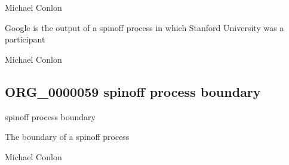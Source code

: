 \documentclass[letterpaper,10pt,english]{sphinxmanual}
\begin{document}
\begin{sphinxShadowBox}

\sphinxAtStartPar
Michael Conlon 
\end{sphinxShadowBox}

\begin{sphinxShadowBox}

\sphinxAtStartPar
Google is the output of a spin\sphinxhyphen{}off process in which Stanford University was a participant
\end{sphinxShadowBox}

\begin{sphinxShadowBox}

\sphinxAtStartPar
Michael Conlon 
\end{sphinxShadowBox}
\begin{quote}

\ignorespaces \end{quote}


\subsection{ORG\_0000059 \sphinxhyphen{} spin\sphinxhyphen{}off process boundary}
\label{\detokenize{doc-ORG_0000059:org-0000059-spin-off-process-boundary}}\label{\detokenize{doc-ORG_0000059:index-0}}\label{\detokenize{doc-ORG_0000059::doc}}
\begin{sphinxShadowBox}

\sphinxAtStartPar
spin\sphinxhyphen{}off process boundary
\end{sphinxShadowBox}

\begin{sphinxShadowBox}

\sphinxAtStartPar
The boundary of a spin\sphinxhyphen{}off process
\end{sphinxShadowBox}

\begin{sphinxShadowBox}

\sphinxAtStartPar
Michael Conlon 
\end{sphinxShadowBox}
\end{document}
